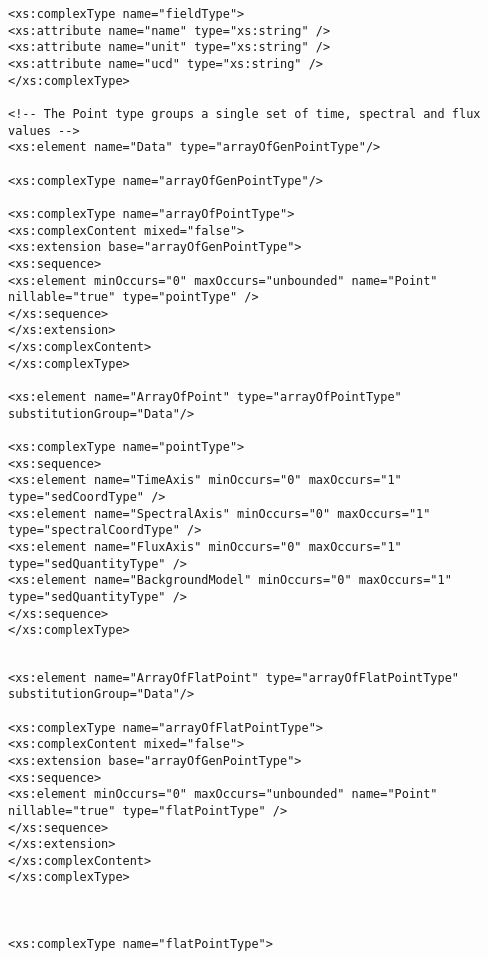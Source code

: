 {\begin{flushleft}
\begin{fmppage}
\begin{verbatim}
<xs:complexType name="fieldType">
<xs:attribute name="name" type="xs:string" />
<xs:attribute name="unit" type="xs:string" />
<xs:attribute name="ucd" type="xs:string" />
</xs:complexType>

<!-- The Point type groups a single set of time, spectral and flux values -->
<xs:element name="Data" type="arrayOfGenPointType"/>

<xs:complexType name="arrayOfGenPointType"/>

<xs:complexType name="arrayOfPointType">
<xs:complexContent mixed="false">
<xs:extension base="arrayOfGenPointType">
<xs:sequence>
<xs:element minOccurs="0" maxOccurs="unbounded" name="Point" nillable="true" type="pointType" />
</xs:sequence>
</xs:extension>
</xs:complexContent>
</xs:complexType>

<xs:element name="ArrayOfPoint" type="arrayOfPointType" substitutionGroup="Data"/>

<xs:complexType name="pointType">
<xs:sequence>
<xs:element name="TimeAxis" minOccurs="0" maxOccurs="1" type="sedCoordType" />
<xs:element name="SpectralAxis" minOccurs="0" maxOccurs="1" type="spectralCoordType" />
<xs:element name="FluxAxis" minOccurs="0" maxOccurs="1" type="sedQuantityType" />
<xs:element name="BackgroundModel" minOccurs="0" maxOccurs="1" type="sedQuantityType" />
</xs:sequence>
</xs:complexType>

\end{verbatim}
\end{fmppage}

\begin{fmppage}
\begin{verbatim}

<xs:element name="ArrayOfFlatPoint" type="arrayOfFlatPointType" substitutionGroup="Data"/>

<xs:complexType name="arrayOfFlatPointType">
<xs:complexContent mixed="false">
<xs:extension base="arrayOfGenPointType">
<xs:sequence>
<xs:element minOccurs="0" maxOccurs="unbounded" name="Point" nillable="true" type="flatPointType" />
</xs:sequence>
</xs:extension>
</xs:complexContent>
</xs:complexType>



<xs:complexType name="flatPointType">


\end{verbatim}
\end{fmppage}
\end{flushleft}}
